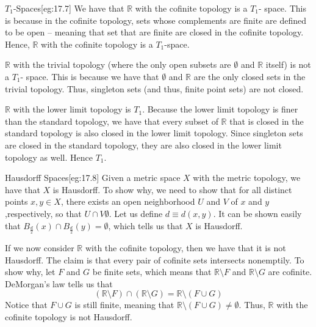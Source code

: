 \begin{egBox}{\( T_{ 1 } \)-Spaces}[eg:17.7]
    We have that \( \mathbb{R} \) with the cofinite topology is a \( T_{ 1 } \)-
    space.
    This is because in the cofinite topology, sets whose complements are finite
    are defined to be open -- meaning that set that are finite are closed in 
    the cofinite topology.
    Hence, \( \mathbb{R} \) with the cofinite topology is a \( T_{ 1 } \)-space.

    \baseRule

    \( \mathbb{R} \) with the trivial topology (where the only open subsets
    are \( \emptyset \) and \( \mathbb{R} \) itself) is not a \( T_{ 1 } \)-
    space.
    This is because we have that \( \emptyset \) and \( \mathbb{R} \) are the 
    only closed sets in the trivial topology. 
    Thus, singleton sets (and thus, finite point sets) are not closed.

    \baseRule

    \( \mathbb{R} \) with the lower limit topology is \( T_{ 1 } \).
    Because the lower limit topology is finer than the standard topology, we 
    have that every subset of \( \mathbb{R} \) that is closed in the standard
    topology is also closed in the lower limit topology.
    Since singleton sets are closed in the standard topology, they are also
    closed in the lower limit topology as well.
    Hence \( T_{ 1 } \).
\end{egBox}

\begin{egBox}{Hausdorff Spaces}[eg:17.8]
    Given a metric space \( X \) with the metric topology, we have that \( X \)
    is Hausdorff.
    To show why, we need to show that for all distinct points \( x, y \in X \),
    there exists an open neighborhood \( U \) and \( V \) of \( x \) and \( y \)
    ,respectively, so that \( U \cap V \emptyset \).
    Let us define \( d \equiv d( x, y ) \).
    It can be shown easily that \( B_{ \frac{ d }{ 2 } } ( x ) \cap 
    B_{ \frac{ d }{ 2 } } ( y ) = \emptyset \), which tells us that \( X \)
    is Hausdorff.

    \baseRule

    If we now consider \( \mathbb{R} \) with the cofinite topology, then we have
    that it is not Hausdorff.
    The claim is that every pair of cofinite sets intersects nonemptily.
    To show why, let \( F \) and \( G \) be finite sets, which means that 
    \( \mathbb{R} \setminus F \) and \( \mathbb{R} \setminus G \) are cofinite.
    DeMorgan's law tells us that 
    \begin{equation*}
        ( \mathbb{R} \setminus F ) \cap ( \mathbb{R} \setminus G )
        =
        \mathbb{R} \setminus ( F \cup G )
    \end{equation*}
    Notice that \( F \cup G \) is still finite, meaning that 
    \( \mathbb{R} \setminus ( F \cup G ) \neq \emptyset \).
    Thus, \( \mathbb{R} \) with the cofinite topology is not Hausdorff.
\end{egBox}

